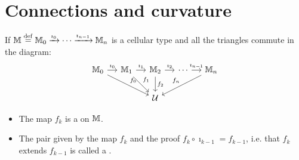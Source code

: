 \documentclass[14pt,aspectratio=169,compress]{beamer}
\begin{document}
\section{Connections and curvature}
\begin{frame}
\begin{definition}
If \( \mathbb{M}\stackrel{\mathrm{def}}{=} \mathbb{M}_0\xrightarrow[]{\imath_0}\cdots\xrightarrow[]{\imath_{n-1}}\mathbb{M}_n \) is a cellular type and all the triangles commute in the diagram:\vspace{-10pt}
\[\begin{tikzcd}[ampersand replacement=\&, column sep=small]
  {\mm_0} \& {\mm_1} \& {\mm_2} \& \cdots \& {\mm_n} \\
\&\& {\mathcal{U}}
\arrow["{\imath_0}", from=1-1, to=1-2]
\arrow["{f_0}", from=1-1, to=2-3]
\arrow["{\imath_1}", from=1-2, to=1-3]
\arrow["{f_1}", from=1-2, to=2-3]
\arrow["{\imath_2}", from=1-3, to=1-4]
\arrow["{f_2}", from=1-3, to=2-3]
\arrow["{\imath_{n-1}}", from=1-4, to=1-5]
\arrow["f_n"', from=1-5, to=2-3]
\end{tikzcd}\]\vspace{-15pt}
\begin{itemize}
\item The map \( f_k \) is a  on \( \mathbb{M} \).
\item The pair given by the map \( f_k \) and the proof \( f_k\circ \imath_{k-1}=f_{k-1} \), i.e. that \( f_k \) extends \( f_{k-1} \) is called a .
\end{itemize}
\end{definition}
\end{frame}
\end{document}
